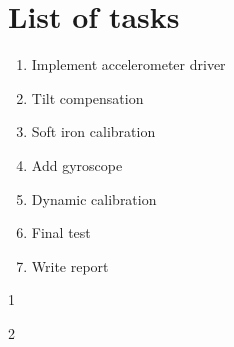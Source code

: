 \chapter{List of tasks}

\begin{enumerate}
	\item Implement accelerometer driver
	\item Tilt compensation
	\item Soft iron calibration
	\item Add gyroscope
	\item Dynamic calibration
	\item Final test
	\item Write report
\end{enumerate}

1

2
